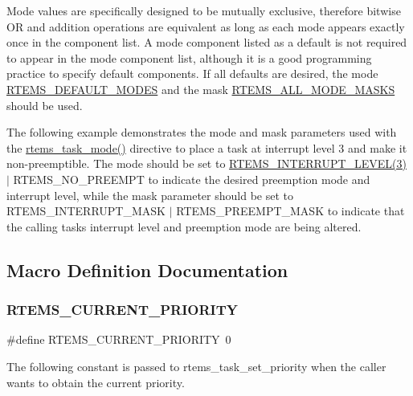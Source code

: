 Mode values are specifically designed to be mutually exclusive, therefore bitwise OR and addition operations are equivalent as long as each mode appears exactly once in the component list. A mode component listed as a default is not required to appear in the mode component list, although it is a good programming practice to specify default components. If all defaults are desired, the mode \mbox{\hyperlink{group__ClassicModes_ga809c838116a3079c58fb6e41d7f1782a}{R\+T\+E\+M\+S\+\_\+\+D\+E\+F\+A\+U\+L\+T\+\_\+\+M\+O\+D\+ES}} and the mask \mbox{\hyperlink{group__ClassicModes_gaf0e90e4128790ead489a17c87d7e3971}{R\+T\+E\+M\+S\+\_\+\+A\+L\+L\+\_\+\+M\+O\+D\+E\+\_\+\+M\+A\+S\+KS}} should be used.

The following example demonstrates the mode and mask parameters used with the \mbox{\hyperlink{group__ClassicTasks_gad74c115e94d1f65c416444b36bf012bf}{rtems\+\_\+task\+\_\+mode()}} directive to place a task at interrupt level 3 and make it non-\/preemptible. The mode should be set to {\ttfamily \mbox{\hyperlink{group__ClassicModes_ga39a1f6143434df1c0bae66cbb083de94}{R\+T\+E\+M\+S\+\_\+\+I\+N\+T\+E\+R\+R\+U\+P\+T\+\_\+\+L\+E\+V\+E\+L(3)}}} $\vert$ {\ttfamily R\+T\+E\+M\+S\+\_\+\+N\+O\+\_\+\+P\+R\+E\+E\+M\+PT} to indicate the desired preemption mode and interrupt level, while the mask parameter should be set to {\ttfamily R\+T\+E\+M\+S\+\_\+\+I\+N\+T\+E\+R\+R\+U\+P\+T\+\_\+\+M\+A\+SK} $\vert$ {\ttfamily R\+T\+E\+M\+S\+\_\+\+P\+R\+E\+E\+M\+P\+T\+\_\+\+M\+A\+SK} to indicate that the calling task\textquotesingle{}s interrupt level and preemption mode are being altered. 

\subsection{Macro Definition Documentation}
\mbox{\label{group__ClassicTasks_ga49bfed4e201631e3a17158e32dc0314b}} 
\subsubsection{\texorpdfstring{RTEMS\_CURRENT\_PRIORITY}{RTEMS\_CURRENT\_PRIORITY}}
{\footnotesize\ttfamily \#define R\+T\+E\+M\+S\+\_\+\+C\+U\+R\+R\+E\+N\+T\+\_\+\+P\+R\+I\+O\+R\+I\+TY~0}

The following constant is passed to rtems\+\_\+task\+\_\+set\+\_\+priority when the caller wants to obtain the current priority. \mbox{\label{group__ClassicTasks_gad7ba85a9018caa1adb89bd5d0e2abea8}} 
